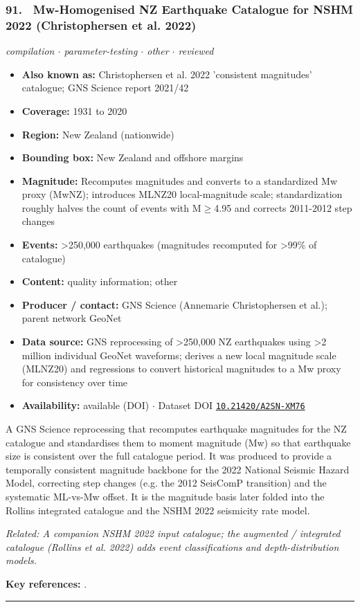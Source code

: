 \documentclass[10pt,a4paper]{article}
\newcommand{\catentryrule}{\par\vspace{3pt}\noindent\textcolor{rulegrey}{\rule{\linewidth}{0.3pt}}\par\vspace{5pt}}
\newcommand{\kv}[2]{\item \textbf{#1:} #2}
\begin{document}
\subsubsection*{\hypertarget{c:91}{91.}~ Mw-Homogenised NZ Earthquake Catalogue for NSHM 2022 (Christophersen et al. 2022)}
{\small\itshape compilation $\cdot$ parameter-testing $\cdot$ other $\cdot$ reviewed}\par\vspace{2pt}
\begin{itemize}[leftmargin=1.3em,itemsep=0.6pt,topsep=1pt,parsep=0pt]
\kv{Also known as}{Christophersen et al. 2022 'consistent magnitudes' catalogue; GNS Science report 2021/42}
\kv{Coverage}{1931 to 2020}
\kv{Region}{New Zealand (nationwide)}
\kv{Bounding box}{New Zealand and offshore margins}
\kv{Magnitude}{Recomputes magnitudes and converts to a standardized Mw proxy (MwNZ); introduces MLNZ20 local-magnitude scale; standardization roughly halves the count of events with M$\geq$4.95 and corrects 2011-2012 step changes}
\kv{Events}{\textgreater{}250,000 earthquakes (magnitudes recomputed for \textgreater{}99\% of catalogue)}
\kv{Content}{quality information; other}
\kv{Producer / contact}{GNS Science (Annemarie Christophersen et al.); parent network GeoNet}
\kv{Data source}{GNS reprocessing of \textgreater{}250,000 NZ earthquakes using \textgreater{}2 million individual GeoNet waveforms; derives a new local magnitude scale (MLNZ20) and regressions to convert historical magnitudes to a Mw proxy for consistency over time}
\kv{Availability}{available (DOI) $\cdot$ Dataset DOI \href{https://doi.org/10.21420/A2SN-XM76}{\nolinkurl{10.21420/A2SN-XM76}}}
\end{itemize}
\par\vspace{2pt}A GNS Science reprocessing that recomputes earthquake magnitudes for the NZ catalogue and standardises them to moment magnitude (Mw) so that earthquake size is consistent over the full catalogue period. It was produced to provide a temporally consistent magnitude backbone for the 2022 National Seismic Hazard Model, correcting step changes (e.g. the 2012 SeisComP transition) and the systematic ML-vs-Mw offset. It is the magnitude basis later folded into the Rollins integrated catalogue and the NSHM 2022 seismicity rate model.
\par{\small\itshape Related: A companion NSHM 2022 input catalogue; the augmented / integrated catalogue (Rollins et al. 2022) adds event classifications and depth-distribution models.}
\par\vspace{2pt}\textbf{Key references:} \cite{Christophersen2022,Christophersen2024}.
\catentryrule
\end{document}
